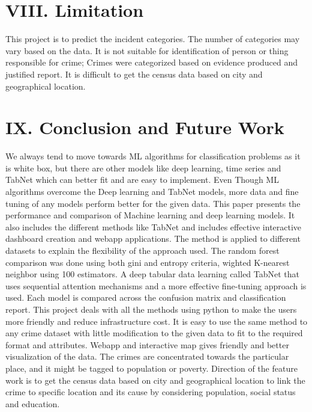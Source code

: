 \documentclass[conference,final,]{IEEEtran}
\begin{document}
\section{VIII. Limitation}\label{viii.-limitation}

This project is to predict the incident categories. The number of
categories may vary based on the data. It is not suitable for
identification of person or thing responsible for crime; Crimes were
categorized based on evidence produced and justified report. It is
difficult to get the census data based on city and geographical
location.

\section{IX. Conclusion and Future
Work}\label{ix.-conclusion-and-future-work}

We always tend to move towards ML algorithms for classification problems
as it is white box, but there are other models like deep learning, time
series and TabNet which can better fit and are easy to implement. Even
Though ML algorithms overcome the Deep learning and TabNet models, more
data and fine tuning of any models perform better for the given data.
This paper presents the performance and comparison of Machine learning
and deep learning models. It also includes the different methods like
TabNet and includes effective interactive dashboard creation and webapp
applications. The method is applied to different datasets to explain the
flexibility of the approach used. The random forest comparison was done
using both gini and entropy criteria, wighted K-nearest neighbor using
100 estimators. A deep tabular data learning called TabNet that uses
sequential attention mechanisms and a more effective fine-tuning
approach is used. Each model is compared across the confusion matrix and
classification report. This project deals with all the methods using
python to make the users more friendly and reduce infrastructure cost.
It is easy to use the same method to any crime dataset with little
modification to the given data to fit to the required format and
attributes. Webapp and interactive map gives friendly and better
visualization of the data. The crimes are concentrated towards the
particular place, and it might be tagged to population or poverty.
Direction of the feature work is to get the census data based on city
and geographical location to link the crime to specific location and its
cause by considering population, social status and education.
\end{document}
